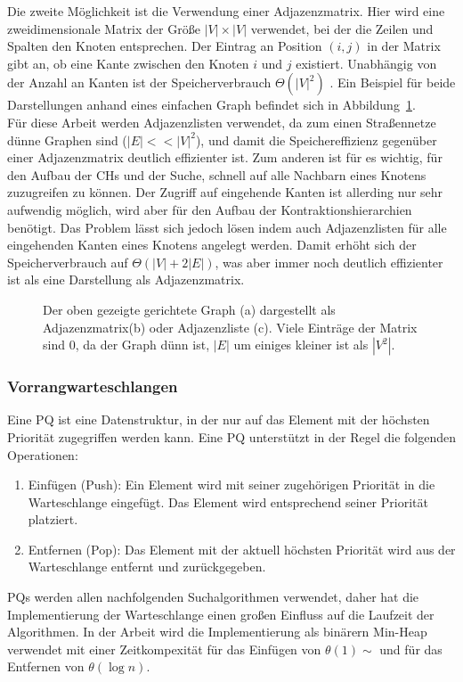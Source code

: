 Die zweite Möglichkeit ist die Verwendung einer Adjazenzmatrix. Hier wird eine zweidimensionale
Matrix der Größe $|V| \times |V|$ verwendet, bei der die Zeilen und Spalten den Knoten entsprechen.
Der Eintrag an Position $(i,j)$ in der Matrix gibt an, ob eine Kante zwischen den Knoten $i$ und $j$
existiert. Unabhängig von der Anzahl an Kanten ist der Speicherverbrauch $\Theta(|V|^2)$
\cite{intro.algo}. Ein Beispiel für beide Darstellungen anhand eines einfachen Graph befindet sich
in Abbildung~\ref{fig:graph_ex1}.\\

Für diese Arbeit werden Adjazenzlisten verwendet, da zum einen Straßennetze dünne Graphen sind ($|E|
    << |V|^2$), und damit die Speichereffizienz gegenüber einer Adjazenzmatrix deutlich effizienter
ist. Zum anderen ist für es wichtig, für den Aufbau der \ac{CHs} und der Suche, schnell auf alle
Nachbarn eines Knotens zuzugreifen zu können. Der Zugriff auf
eingehende Kanten ist allerding nur sehr aufwendig  möglich, wird  aber für den Aufbau der
Kontraktionshierarchien benötigt. Das Problem lässt sich jedoch lösen indem auch
Adjazenzlisten für alle eingehenden Kanten eines Knotens angelegt werden. Damit erhöht sich der
Speicherverbrauch auf $\Theta(|V| + 2|E|)$, was aber immer noch deutlich effizienter ist als
eine Darstellung als Adjazenzmatrix.%

\begin{figure}[H]
    \centering
    
    \caption[Graph als Adjazenzmatrix und Adjazenzliste]{Der oben gezeigte gerichtete Graph (a) dargestellt als Adjazenzmatrix(b) oder
        Adjazenzliste (c). Viele Einträge der Matrix sind 0, da der Graph dünn ist, \dH $|E|$
        um einiges kleiner ist als $|V^2|$.}
    \label{fig:graph_ex1}
\end{figure}

\subsubsection{Vorrangwarteschlangen}
Eine \ac{PQ} ist eine Datenstruktur, in der nur auf das Element mit der höchsten Priorität
zugegriffen werden kann. Eine \ac{PQ} unterstützt in der Regel die folgenden Operationen:
\begin{enumerate}
    \item Einfügen (Push): Ein Element wird mit seiner zugehörigen Priorität in die Warteschlange
          eingefügt. Das Element wird entsprechend seiner Priorität platziert.
    \item Entfernen (Pop): Das Element mit der aktuell höchsten Priorität wird aus der Warteschlange
          entfernt und zurückgegeben.
\end{enumerate}
\ac{PQ}s werden allen nachfolgenden Suchalgorithmen verwendet, daher hat die Implementierung der
Warteschlange einen großen Einfluss auf die Laufzeit der Algorithmen. In der Arbeit wird die
Implementierung als binärern Min-Heap verwendet mit einer Zeitkompexität für das Einfügen von
$\theta(1)\sim$ und für das Entfernen von $\theta(\log n)$.

